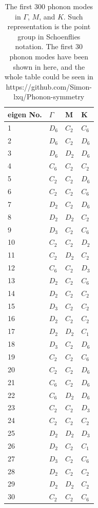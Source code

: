 \documentclass[aps,prl,twocolumn,amsmath,amssymb]{revtex4-2}
\begin{document}
\begin{table}
	\caption{\label{tab:table1}The first 300 phonon modes in $\Gamma$, $M$, and $K$. Such representation is the point group in Schoenflies notation. The first 30 phonon modes have been shown in here, and the whole table could be seen in https://github.com/Simon-lxq/Phonon-symmetry}
		\begin{tabular}{p{3cm}|p{3cm}|p{3cm}|p{3cm}|}
			eigen No.&$\Gamma$&M&K\\ \hline
			1&$D_6$&$C_2$&$C_6$\\
			2&$D_6$&$C_2$&$D_6$\\
			3&$D_6$&$D_2$&$D_6$\\
			4&$C_6$&$C_2$&$C_2$\\
			5&$C_2$&$C_2$&$D_6$\\
			6&$C_2$&$C_2$&$C_6$\\
			7&$D_2$&$C_2$&$D_6$\\
			8&$D_2$&$D_2$&$C_2$\\
			9&$D_3$&$C_2$&$C_6$\\
			10&$C_2$&$C_2$&$D_2$\\
			11&$C_2$&$D_2$&$C_2$\\
			12&$C_6$&$C_2$&$D_3$\\
			13&$D_2$&$C_2$&$C_6$\\
			14&$D_2$&$C_2$&$C_2$\\
			15&$D_3$&$C_2$&$C_2$\\
			16&$D_2$&$C_2$&$C_2$\\
			17&$D_2$&$D_2$&$C_1$\\
			18&$D_3$&$C_2$&$D_6$\\
			19&$C_2$&$C_2$&$C_6$\\
			20&$C_2$&$C_2$&$D_6$\\
			21&$C_6$&$C_2$&$D_6$\\
			22&$C_6$&$D_2$&$D_6$\\
			23&$C_2$&$C_2$&$D_3$\\
			24&$C_2$&$C_2$&$C_2$\\
			25&$D_2$&$D_2$&$D_3$\\
			26&$D_2$&$C_2$&$C_1$\\
			27&$D_3$&$C_2$&$C_6$\\
			28&$D_2$&$C_2$&$C_2$\\
			29&$D_2$&$D_2$&$C_2$\\
			30&$C_2$&$C_2$&$C_6$\\

\end{tabular}
\end{table}
\end{document}
